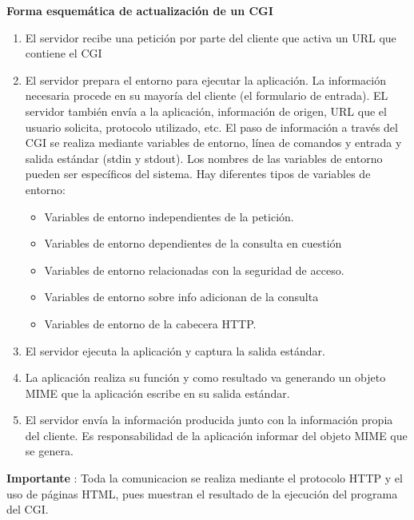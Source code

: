 \documentclass{apuntes}
\begin{document}
\textbf{Forma esquemática de actualización de un CGI}
\begin{enumerate}
\item El servidor recibe una petición por parte del cliente que activa un URL que contiene el CGI
\item El servidor prepara el entorno para ejecutar la aplicación. La información necesaria procede en su mayoría del cliente (el formulario de entrada). EL servidor también envía a la aplicación, información de origen, URL que el usuario solicita, protocolo utilizado, etc. El paso de información a través del CGI se realiza mediante variables de entorno, línea de comandos y entrada y salida estándar (stdin y stdout). Los nombres de las variables de entorno pueden ser específicos del sistema. Hay diferentes tipos de variables de entorno:
\begin{itemize}
\item Variables de entorno independientes de la petición.
\item Variables de entorno dependientes de la consulta en cuestión
\item Variables de entorno relacionadas con la seguridad de acceso.
\item Variables de entorno sobre info adicionan de la consulta
\item Variables de entorno de la cabecera HTTP.
\end{itemize}
\item El  servidor ejecuta la aplicación y captura la salida estándar.
\item La aplicación realiza su función y como resultado va generando un objeto MIME que la aplicación escribe en su salida estándar.
\item El servidor envía la información producida junto con la información propia del cliente. Es responsabilidad de la aplicación informar del objeto MIME que se genera.

\end{enumerate}
\textbf{Importante} : Toda la comunicacion se realiza mediante el protocolo HTTP y el uso de páginas HTML, pues muestran el resultado de la ejecución del programa del CGI.
\end{document}
